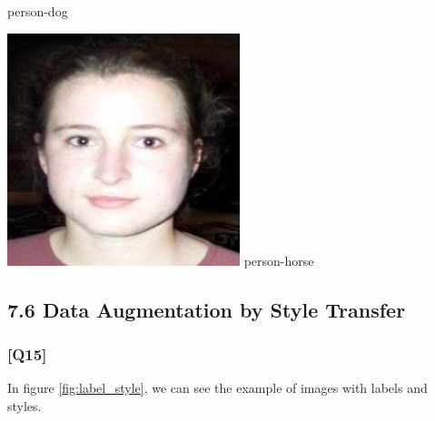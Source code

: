 \documentclass{article}
\begin{document}
\begin{center}
\begin{minipage}{0.142\textwidth}
        person-dog
    \end{minipage}%
    \begin{minipage}{0.142\textwidth}
        \includegraphics[width=\linewidth]{./pic/misclassified_r6_p4_1641.jpg}
        person-horse
    \end{minipage}%

    \label{fig:misclassified}
\end{center}

\subsection*{7.6 Data Augmentation by Style Transfer}

\subsubsection*{[Q15]}

In figure \ref{fig:label_style}, we can see the example of images with labels and styles.
\end{document}
